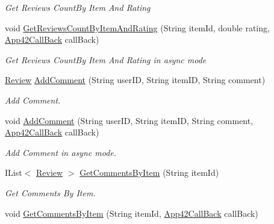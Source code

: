 \begin{DoxyCompactItemize}
\begin{DoxyCompactList}\small\item\em Get Reviews Count\+By Item And Rating \end{DoxyCompactList}\item 
void \hyperlink{classcom_1_1shephertz_1_1app42_1_1paas_1_1sdk_1_1csharp_1_1review_1_1_review_service_adbf158acbf4757c6f630bc3326eef194}{Get\+Reviews\+Count\+By\+Item\+And\+Rating} (String item\+Id, double rating, \hyperlink{interfacecom_1_1shephertz_1_1app42_1_1paas_1_1sdk_1_1csharp_1_1_app42_call_back}{App42\+Call\+Back} call\+Back)
\begin{DoxyCompactList}\small\item\em Get Reviews Count\+By Item And Rating in async mode \end{DoxyCompactList}\item 
\hyperlink{classcom_1_1shephertz_1_1app42_1_1paas_1_1sdk_1_1csharp_1_1review_1_1_review}{Review} \hyperlink{classcom_1_1shephertz_1_1app42_1_1paas_1_1sdk_1_1csharp_1_1review_1_1_review_service_aeefae3b2f9f1ecd20508461672f5b388}{Add\+Comment} (String user\+I\+D, String item\+I\+D, String comment)
\begin{DoxyCompactList}\small\item\em Add Comment. \end{DoxyCompactList}\item 
void \hyperlink{classcom_1_1shephertz_1_1app42_1_1paas_1_1sdk_1_1csharp_1_1review_1_1_review_service_a770163b415957e30bf2a9a2b700c81b9}{Add\+Comment} (String user\+I\+D, String item\+I\+D, String comment, \hyperlink{interfacecom_1_1shephertz_1_1app42_1_1paas_1_1sdk_1_1csharp_1_1_app42_call_back}{App42\+Call\+Back} call\+Back)
\begin{DoxyCompactList}\small\item\em Add Comment in async mode. \end{DoxyCompactList}\item 
I\+List$<$ \hyperlink{classcom_1_1shephertz_1_1app42_1_1paas_1_1sdk_1_1csharp_1_1review_1_1_review}{Review} $>$ \hyperlink{classcom_1_1shephertz_1_1app42_1_1paas_1_1sdk_1_1csharp_1_1review_1_1_review_service_ab019892e82955457b8aad387cd9167f7}{Get\+Comments\+By\+Item} (String item\+Id)
\begin{DoxyCompactList}\small\item\em Get Comments By Item. \end{DoxyCompactList}\item 
void \hyperlink{classcom_1_1shephertz_1_1app42_1_1paas_1_1sdk_1_1csharp_1_1review_1_1_review_service_a29b50f6e1651ebc43ed2d12b1482b0ce}{Get\+Comments\+By\+Item} (String item\+Id, \hyperlink{interfacecom_1_1shephertz_1_1app42_1_1paas_1_1sdk_1_1csharp_1_1_app42_call_back}{App42\+Call\+Back} call\+Back)

\end{DoxyCompactItemize}
